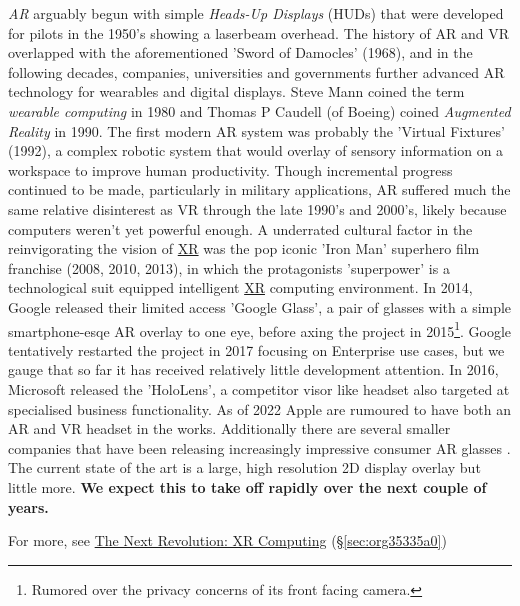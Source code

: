 \documentclass[logo,bsc,singlespacing,parskip]{infthesis}
\begin{document}
\emph{AR} arguably begun with simple \emph{Heads-Up Displays} (HUDs) that were developed for pilots in the 1950's showing a laserbeam overhead.
The history of AR and VR overlapped with the aforementioned 'Sword of Damocles' (1968), and in the following decades, companies, universities and governments further advanced AR technology for wearables and digital displays.
Steve Mann coined the term \emph{wearable computing} in 1980 and Thomas P Caudell (of Boeing) coined \emph{Augmented Reality} in 1990.
The first modern AR system was probably the 'Virtual Fixtures' (1992), a complex robotic system that would overlay of sensory information on a workspace to improve human productivity.
Though incremental progress continued to be made, particularly in military applications, AR suffered much the same relative disinterest as VR through the late 1990's and 2000's, likely because computers weren't yet powerful enough.
A underrated cultural factor in the reinvigorating the vision of \hyperref[org53dbe83]{XR} was the pop iconic 'Iron Man' superhero film franchise (2008, 2010, 2013),  in which the protagonists 'superpower' is a technological suit equipped intelligent \hyperref[org53dbe83]{XR} computing environment.
In 2014, Google released their limited access 'Google Glass', a pair of glasses with a simple smartphone-esqe AR overlay to one eye, before axing the project in 2015\footnote{Rumored over the privacy concerns of its front facing camera.}.
Google tentatively restarted the project in 2017 focusing on Enterprise use cases, but we gauge that so far it has received relatively little development attention.
In 2016, Microsoft released the 'HoloLens', a competitor visor like headset also targeted at specialised business functionality.
As of 2022 Apple are rumoured to have both an AR and VR headset in the works.
Additionally there are several smaller companies that have been releasing increasingly impressive consumer AR glasses \autocites{NrealAir}[][]{INMOAIRWorld}[][]{VuzixBladeUpgraded} .
The current state of the art is a large, high resolution 2D display overlay but little more.
\textbf{We expect this to take off rapidly over the next couple of years.}

For more, see \hyperref[sec:org35335a0]{The Next Revolution: XR Computing} (\S \ref{sec:org35335a0})
\end{document}
